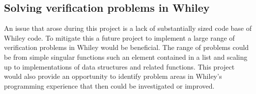 \subsection{Solving verification problems in Whiley}

An issue that arose during this project is a lack of substantially sized code base
of Whiley code.
To mitigate this a future project to implement a large range of 
verification problems in Whiley would be beneficial.
The range of problems could be from simple singular functions such an element
contained in a list and scaling up to implementations of data structures and related
functions.
This project would also provide an opportunity to identify problem areas
in Whiley's programming experience that then could be investigated or improved.